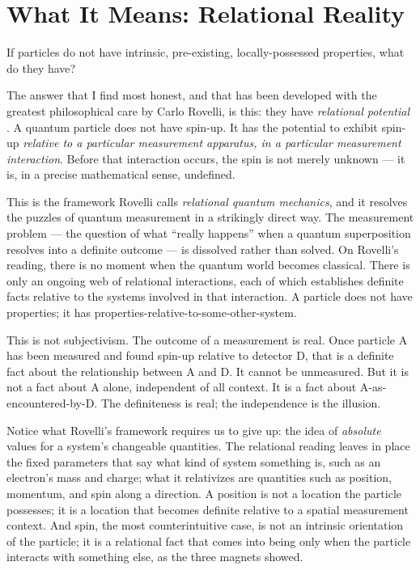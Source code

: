 \section{What It Means: Relational Reality}
\label{sec:ch1-relational}

If particles do not have intrinsic, pre-existing, locally-possessed properties, what do they have?

The answer that I find most honest, and that has been developed with the greatest philosophical care by Carlo Rovelli, is this: they have \emph{relational potential} \citep{Rovelli1996,Rovelli2021}. A quantum particle does not have spin-up. It has the potential to exhibit spin-up \emph{relative to a particular measurement apparatus, in a particular measurement interaction}. Before that interaction occurs, the spin is not merely unknown --- it is, in a precise mathematical sense, undefined.

This is the framework Rovelli calls \emph{relational quantum mechanics}, and it resolves the puzzles of quantum measurement in a strikingly direct way. The measurement problem --- the question of what ``really happens'' when a quantum superposition resolves into a definite outcome --- is dissolved rather than solved. On Rovelli's reading, there is no moment when the quantum world becomes classical. There is only an ongoing web of relational interactions, each of which establishes definite facts relative to the systems involved in that interaction. A particle does not have properties; it has properties-relative-to-some-other-system.

This is not subjectivism. The outcome of a measurement is real. Once particle A has been measured and found spin-up relative to detector D, that is a definite fact about the relationship between A and D. It cannot be unmeasured. But it is not a fact about A alone, independent of all context. It is a fact about A-as-encountered-by-D. The definiteness is real; the independence is the illusion.

Notice what Rovelli's framework requires us to give up: the idea of \emph{absolute} values for a system's changeable quantities. The relational reading leaves in place the fixed parameters that say what kind of system something is, such as an electron's mass and charge; what it relativizes are quantities such as position, momentum, and spin along a direction. A position is not a location the particle possesses; it is a location that becomes definite relative to a spatial measurement context. And spin, the most counterintuitive case, is not an intrinsic orientation of the particle; it is a relational fact that comes into being only when the particle interacts with something else, as the three magnets showed.

